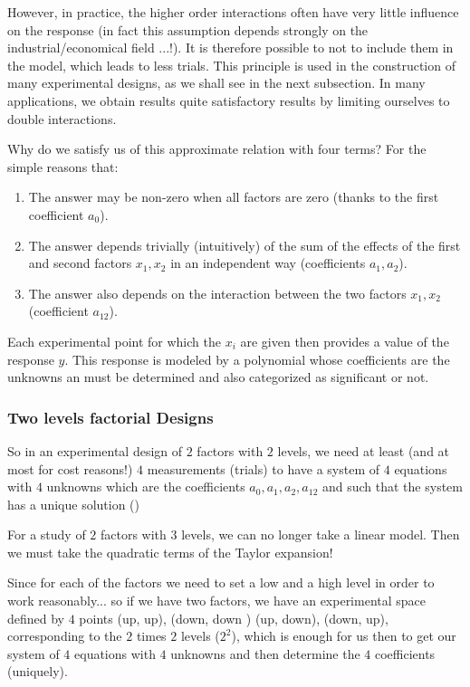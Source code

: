 	However, in practice, the higher order interactions often have very little influence on the response (in fact this assumption depends strongly on the industrial/economical field ...!). It is therefore possible to not to include them in the model, which leads to less trials. This principle is used in the construction of many experimental designs, as we shall see in the next subsection. In many applications, we obtain results quite satisfactory results by limiting ourselves to double interactions.
	
	Why do we satisfy us of this approximate relation with four terms? For the simple reasons that:
	
	\begin{enumerate}
		\item The answer may be non-zero when all factors are zero (thanks to the first coefficient $a_0$).

		\item The answer depends trivially (intuitively) of the sum of the effects of the first and second factors $x_1,x_2$ in an independent way (coefficients $a_1,a_2$).

		\item The answer also depends on the interaction between the two factors $x_1,x_2$ (coefficient $a_{12}$).
	\end{enumerate}
	Each experimental point for which the $x_i$ are given then provides a value of the response $y$. This response is modeled by a polynomial whose coefficients are the unknowns an must be determined and also categorized as significant or not.
	
	\subsubsection{Two levels factorial Designs}
	So in an experimental design of $2$ factors with $2$ levels, we need at least (and at most for cost reasons!) $4$ measurements (trials) to have a system of $4$ equations with $4$ unknowns which are the coefficients $a_0,a_1,a_2,a_{12}$ and such that the system has a unique solution ()
	
	\begin{tcolorbox}[title=Remark,colframe=black,arc=10pt]
	For a study of $2$ factors with $3$ levels, we can no longer take a linear model. Then we must take the quadratic terms of the Taylor expansion!
	\end{tcolorbox}	
	Since for each of the factors we need to set a low and a high level in order to work reasonably... so if we have two factors, we have an experimental space defined by $4$ points {(up, up), (down, down ) (up, down), (down, up)}, corresponding to the $2$ times $2$ levels ($2^2$), which is enough for us then to get our system of $4$ equations with $4$ unknowns and then determine the $4$ coefficients (uniquely).
	
